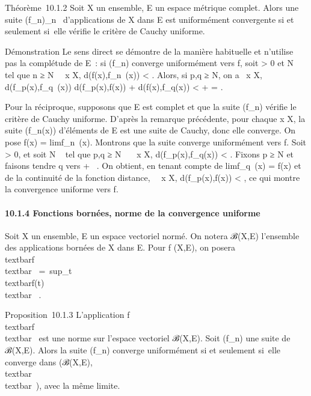\documentclass[]{article}
\begin{document}
Théorème~10.1.2 Soit X un ensemble, E un espace métrique complet. Alors
une suite (f\_n)\_n\in{}~ d'applications de X dans E est
uniformément convergente si et seulement si~elle vérifie le critère de
Cauchy uniforme.

Démonstration Le sens direct se démontre de la manière habituelle et
n'utilise pas la complétude de E~: si (f\_n) converge
uniformément vers f, soit \epsilon \textgreater{} 0 et N \in {}~ tel que n ≥ N
\rigtharrow~\forall~x \in X, d(f(x),f\_n~(x)) \textless{}
\epsilon {} . Alors, si p,q ≥ N, on a
\forall~x \in X, d(f\_p(x),f\_q~(x)) \leq
d(f\_p(x),f(x)) + d(f(x),f\_q(x)) \textless{} \epsilon
{} + \epsilon {} = \epsilon.

Pour la réciproque, supposons que E est complet et que la suite
(f\_n) vérifie le critère de Cauchy uniforme. D'après la
remarque précédente, pour chaque x \in X, la suite (f\_n(x))
d'éléments de E est une suite de Cauchy, donc elle converge. On pose
f(x) = limf\_n~(x). Montrons que la
suite converge uniformément vers f. Soit \epsilon \textgreater{} 0, et soit N \in
{}~ tel que p,q ≥ N \rigtharrow~\forall~~x \in X,
d(f\_p(x),f\_q(x)) \textless{} \epsilon {} . Fixons p ≥ N et faisons tendre q vers + \infty~. On obtient, en tenant
compte de limf\_q~(x) = f(x) et de la
continuité de la fonction distance, \forall~~x \in X,
d(f\_p(x),f(x)) \leq \epsilon {} \textless{} \epsilon, ce
qui montre la convergence uniforme vers f.

\paragraph{10.1.4 Fonctions bornées, norme de la convergence uniforme}

Soit X un ensemble, E un espace vectoriel normé. On notera ℬ(X,E)
l'ensemble des applications bornées de X dans E. Pour f (X,E), on
posera \\textbar{}f\\textbar{}\infty~
=\
sup\_t\inX\\textbar{}f(t)\\textbar{}
\in {}~.

Proposition~10.1.3 L'application
f\mapsto~\\textbar{}f\\textbar{}\infty~
est une norme sur l'espace vectoriel ℬ(X,E). Soit (f\_n) une
suite de ℬ(X,E). Alors la suite (f\_n) converge uniformément si
et seulement si~elle converge dans (ℬ(X,E),\\textbar{}
\\textbar{}\infty~), avec la même limite.
\end{document}
